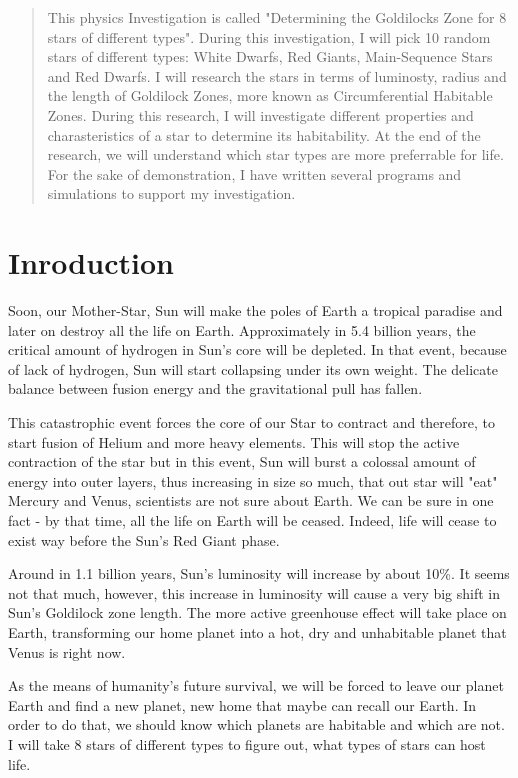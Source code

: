 \documentclass[a4paper]{IEEEtran}
\begin{document}
\begin{abstract}
  This physics Investigation is called "Determining the Goldilocks Zone for 8 stars of different types".
  During this investigation, I will pick 10 random stars of different types: White Dwarfs, Red Giants, Main-Sequence Stars and Red Dwarfs.
  I will research the stars in terms of luminosty, radius and the length of Goldilock Zones, more known as Circumferential Habitable Zones.
  During this research, I will investigate different properties and charasteristics of a star to determine its habitability.
  At the end of the research, we will understand which star types are more preferrable for life.
  For the sake of demonstration, I have written several programs and simulations to support my investigation. 
  \end{abstract}

\newpage

\section{Inroduction}

Soon, our Mother-Star, Sun will make the poles of Earth a tropical paradise and later on destroy all the life on Earth. Approximately in 5.4 billion years, the critical amount of hydrogen in Sun's core will be depleted. In that event, because of lack of hydrogen, Sun will start collapsing under its own weight. The delicate balance between fusion energy and the gravitational pull has fallen.

This catastrophic event forces the core of our Star to contract and therefore, to start fusion of Helium and more heavy elements. This will stop the active contraction of the star but in this event, Sun will burst a colossal amount of energy into outer layers, thus increasing in size so much, that out star will "eat" Mercury and Venus, scientists are not sure about Earth. We can be sure in one fact -  by that time, all the life on Earth will be ceased. Indeed, life will cease to exist way before the Sun's Red Giant phase.

Around in 1.1 billion years, Sun's luminosity will increase by about 10\%. It seems not that much, however, this increase in luminosity will cause a very big shift in Sun's Goldilock zone length. The more active greenhouse effect will take place on Earth, transforming our home planet into a hot, dry and unhabitable planet that Venus is right now.\cite{sun}

As the means of humanity's future survival, we will be forced to leave our planet Earth and find a new planet, new home that maybe can recall our Earth. In order to do that, we should know which planets are habitable and which are not. I will take 8 stars of different types to figure out, what types of stars can host life.
\end{document}
